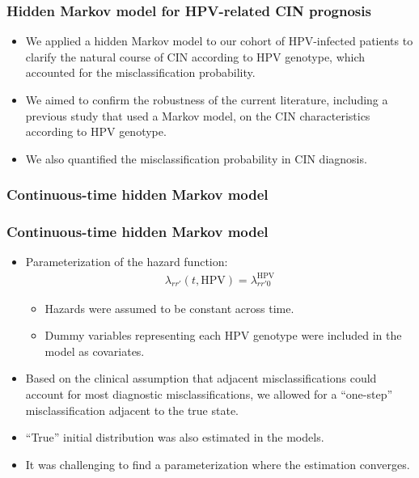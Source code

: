 \documentclass[aspectratio=169, 12pt]{beamer}
\begin{document}
	\begin{frame}
	\frametitle{Hidden Markov model for HPV-related CIN prognosis}
	\begin{itemize}
	\item We applied a hidden Markov model to our cohort of HPV-infected patients to clarify the natural course of CIN according to HPV genotype, which accounted for the misclassification probability.
	\item We aimed to confirm the robustness of the current literature, including a previous study that used a Markov model, on the CIN characteristics according to HPV genotype.
	\item We also quantified the misclassification probability in CIN diagnosis.

	\end{itemize}
	\end{frame}

	\begin{frame}
	\frametitle{Continuous-time hidden Markov model}
	\end{frame}

	\begin{frame}
	\frametitle{Continuous-time hidden Markov model}
	\begin{itemize}
	\item Parameterization of the hazard function:
	\begin{eqnarray*}
	\lambda_{rr'} (t, \text{HPV}) = \lambda_{rr'0}^{\text{HPV}}
	\end{eqnarray*}
	\vspace*{-20pt}
	\begin{itemize}
	\item Hazards were assumed to be constant across time.
	\item Dummy variables representing each HPV genotype were included in the model as covariates.
	\end{itemize}
	\item Based on the clinical assumption that adjacent misclassifications could account for most diagnostic misclassifications, we allowed for a ``one-step'' misclassification adjacent to the true state.
	\item ``True'' initial distribution was also estimated in the models.
	\item It was challenging to find a parameterization where the estimation converges.

	\end{itemize}


	\end{frame}
\end{document}
